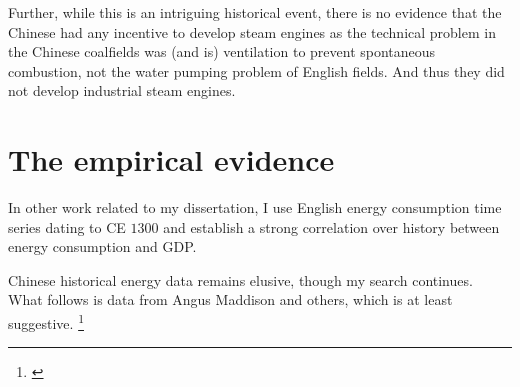 \documentclass[12pt]{article}
\numberwithin{equation}{section}
\begin{document}
		Further, while this is an intriguing historical event, there is no evidence that the Chinese had any incentive to develop steam engines as the technical problem in the Chinese coalfields was (and is) ventilation to prevent spontaneous combustion, not the water pumping problem of English fields. And thus they did not develop industrial steam engines.
		

	\section{The empirical evidence}
	
	In other work related to my dissertation, I use English energy consumption time series dating to CE $1300$ and establish a strong correlation over history between energy consumption and GDP.
	
	Chinese historical energy data remains elusive, though my search continues. What follows is data from Angus Maddison and others, which is at least suggestive. \footnote{\citet[p.~10]{maddison_growth_2003}}
	
\end{document}
